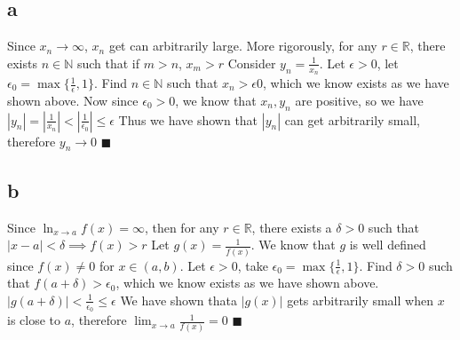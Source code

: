 \documentclass[12pt]{article}
\newcommand{\N}{\mathbb{N}}
\newcommand{\R}{\mathbb{R}}
\begin{document}
\subsection{a}
Since $x_n \to \infty$, $x_n$ get can arbitrarily large. More rigorously, for any $r \in \R$, there exists $n \in \N$ such that if $m > n$, $x_m > r$
\newline
Consider $y_n = \frac{1}{x_n}$. Let $\epsilon > 0$, let $\epsilon_0 = \max \{ \frac{1}{\epsilon}, 1\}$. Find $n \in \N$ such that $x_n > \epsilon 0$, which we know exists as we have shown above.
Now since $\epsilon_0 > 0$, we know that $x_n, y_n$ are positive, so we have $|y_n| = |\frac{1}{x_n}| < |\frac{1}{\epsilon_0}| \leq \epsilon$
\newline
Thus we have shown that $|y_n|$ can get arbitrarily small, therefore $y_n \to 0$
\newline
$\blacksquare$

\subsection{b}
Since $\ln_{x \to a} f(x) = \infty$, then for any $r \in \R$, there exists a $\delta > 0$ such that $|x-a|<\delta \implies f(x)>r$
\newline
Let $g(x)=\frac{1}{f(x)}$. We know that $g$ is well defined since $f(x)\not = 0$ for $x \in (a,b)$. Let $\epsilon > 0$, take $\epsilon_0 = \max \{ \frac{1}{\epsilon}, 1\}$. Find $\delta > 0$ such that $f(a+\delta) > \epsilon_0$, which we know exists as we have shown above.
\newline
$|g(a+\delta)| < \frac{1}{\epsilon_0} \leq \epsilon$ We have shown thata $|g(x)|$ gets arbitrarily small when $x$ is close to $a$, therefore $\lim_{x\to a}\frac{1}{f(x)}=0$
\newline
$\blacksquare$
\newpage
\end{document}
